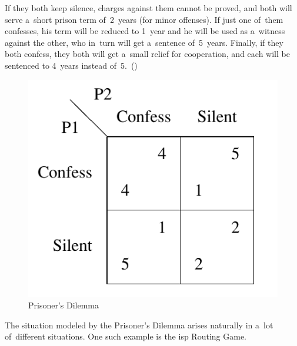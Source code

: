 \begin{description}
    If they both keep silence, charges against them cannot be proved, and both will serve a~short prison term of~2~years (for minor offenses).
    If just one of~them confesses, his term will be reduced to 1~year and he will be used as a~witness against the other, who in~turn will get a~sentence of~5~years.
    Finally, if they both confess, they both will get a~small relief for cooperation, and each will be sentenced to 4~years instead of~5.~(\cite[Section~1.1.1]{AGT07})
    \begin{figure}[H]
      \centering
      \includegraphics[width=.25\paperwidth]{../img/prisoner.png}
      \caption{Prisoner's Dilemma}
      \label{fig:prisoner}
    \end{figure}
    The situation modeled by the Prisoner's Dilemma arises naturally in a~lot of~different situations.
    One such example is the \acrshort{isp} Routing Game.


\end{description}
